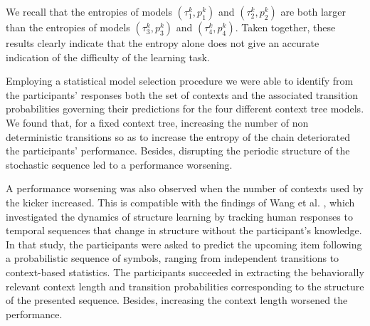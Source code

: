 \documentclass[fleqn,10pt]{wlscirep}
\begin{document}
We recall that the entropies of models $(\tau^k_1, p^k_1)$ and $(\tau^k_2, p^k_2)$ are both larger than the entropies of models $(\tau^k_3, p^k_3)$ and $(\tau^k_4, p^k_4)$. Taken together, these results clearly indicate that the entropy alone does not give an accurate indication of the difficulty of the learning task. %


Employing a statistical model selection procedure we were able to identify from the participants' responses both the set of contexts and the associated transition probabilities governing their predictions for the four different context tree models. We found that, for a fixed context tree, increasing the number of non deterministic transitions so as to increase the entropy of the chain deteriorated the participants' performance. Besides, disrupting the periodic structure of the stochastic sequence led to a performance worsening.

A performance worsening was also observed when the number of contexts used by the kicker increased. This is compatible with the findings of Wang et al. \cite{wang_learning_2017}, which investigated the dynamics of structure learning by tracking human responses to temporal sequences that change in structure without the participant's knowledge. In that study, the participants were asked to predict the upcoming item following a probabilistic sequence of symbols, ranging from independent transitions to context-based statistics. The participants succeeded in extracting the behaviorally relevant context length and transition probabilities corresponding to the structure of the presented sequence. Besides, increasing the context length worsened the performance.  
\end{document}
